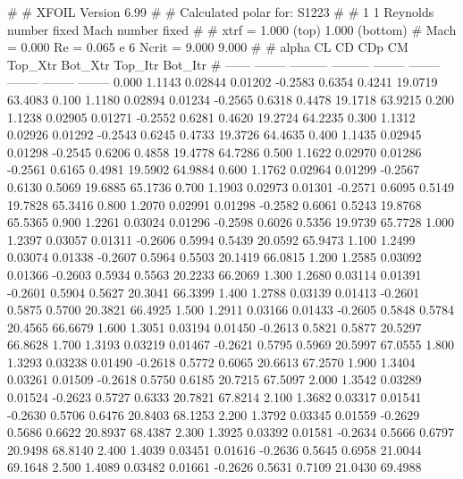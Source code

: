 #  
#       XFOIL         Version 6.99
#  
# Calculated polar for: S1223                                           
#  
# 1 1 Reynolds number fixed          Mach number fixed         
#  
# xtrf =   1.000 (top)        1.000 (bottom)  
# Mach =   0.000     Re =     0.065 e 6     Ncrit =   9.000  9.000
#  
#   alpha    CL        CD       CDp       CM     Top_Xtr  Bot_Xtr  Top_Itr  Bot_Itr
#  ------ -------- --------- --------- -------- -------- -------- -------- --------
   0.000   1.1143   0.02844   0.01202  -0.2583   0.6354   0.4241  19.0719  63.4083
   0.100   1.1180   0.02894   0.01234  -0.2565   0.6318   0.4478  19.1718  63.9215
   0.200   1.1238   0.02905   0.01271  -0.2552   0.6281   0.4620  19.2724  64.2235
   0.300   1.1312   0.02926   0.01292  -0.2543   0.6245   0.4733  19.3726  64.4635
   0.400   1.1435   0.02945   0.01298  -0.2545   0.6206   0.4858  19.4778  64.7286
   0.500   1.1622   0.02970   0.01286  -0.2561   0.6165   0.4981  19.5902  64.9884
   0.600   1.1762   0.02964   0.01299  -0.2567   0.6130   0.5069  19.6885  65.1736
   0.700   1.1903   0.02973   0.01301  -0.2571   0.6095   0.5149  19.7828  65.3416
   0.800   1.2070   0.02991   0.01298  -0.2582   0.6061   0.5243  19.8768  65.5365
   0.900   1.2261   0.03024   0.01296  -0.2598   0.6026   0.5356  19.9739  65.7728
   1.000   1.2397   0.03057   0.01311  -0.2606   0.5994   0.5439  20.0592  65.9473
   1.100   1.2499   0.03074   0.01338  -0.2607   0.5964   0.5503  20.1419  66.0815
   1.200   1.2585   0.03092   0.01366  -0.2603   0.5934   0.5563  20.2233  66.2069
   1.300   1.2680   0.03114   0.01391  -0.2601   0.5904   0.5627  20.3041  66.3399
   1.400   1.2788   0.03139   0.01413  -0.2601   0.5875   0.5700  20.3821  66.4925
   1.500   1.2911   0.03166   0.01433  -0.2605   0.5848   0.5784  20.4565  66.6679
   1.600   1.3051   0.03194   0.01450  -0.2613   0.5821   0.5877  20.5297  66.8628
   1.700   1.3193   0.03219   0.01467  -0.2621   0.5795   0.5969  20.5997  67.0555
   1.800   1.3293   0.03238   0.01490  -0.2618   0.5772   0.6065  20.6613  67.2570
   1.900   1.3404   0.03261   0.01509  -0.2618   0.5750   0.6185  20.7215  67.5097
   2.000   1.3542   0.03289   0.01524  -0.2623   0.5727   0.6333  20.7821  67.8214
   2.100   1.3682   0.03317   0.01541  -0.2630   0.5706   0.6476  20.8403  68.1253
   2.200   1.3792   0.03345   0.01559  -0.2629   0.5686   0.6622  20.8937  68.4387
   2.300   1.3925   0.03392   0.01581  -0.2634   0.5666   0.6797  20.9498  68.8140
   2.400   1.4039   0.03451   0.01616  -0.2636   0.5645   0.6958  21.0044  69.1648
   2.500   1.4089   0.03482   0.01661  -0.2626   0.5631   0.7109  21.0430  69.4988
